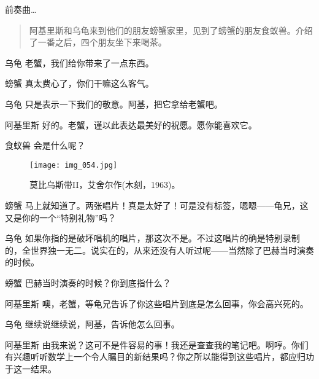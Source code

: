 
\begin{dialog}{前奏曲…}

\begin{quote}
阿基里斯和乌龟来到他们的朋友螃蟹家里，见到了螃蟹的朋友食蚁兽。介绍了一番之后，四个朋友坐下来喝茶。
\end{quote}

\begin{dialogue}

\item[乌龟]老蟹，我们给你带来了一点东西。

\item[螃蟹]真太费心了，你们干嘛这么客气。

\item[乌龟]只是表示一下我们的敬意。阿基，把它拿给老蟹吧。

\item[阿基里斯]好的。老蟹，谨以此表达最美好的祝愿。愿你能喜欢它。


\item[食蚁兽]会是什么呢？

\begin{figure}
\texttt{[image: img\_054.jpg]}
\caption[莫比乌斯带II，艾舍尔作。]
  {莫比乌斯带II，艾舍尔作(木刻，1963)。}
\end{figure}

\item[螃蟹]马上就知道了。两张唱片！真是太好了！可是没有标签，嗯嗯——龟兄，这又是你的一个“特别礼物”吗？

\item[乌龟]如果你指的是破坏唱机的唱片，那这次不是。不过这唱片的确是特别录制的，全世界独一无二。说实在的，从来还没有人听过呢——当然除了巴赫当时演奏的时候。

\item[螃蟹]巴赫当时演奏的时候？你到底指什么？

\item[阿基里斯]噢，老蟹，等龟兄告诉了你这些唱片到底是怎么回事，你会高兴死的。

\item[乌龟]继续说继续说，阿基，告诉他怎么回事。

\item[阿基里斯]由我来说？这可不是件容易的事！我还是查查我的笔记吧。啊哼。你们有兴趣听听数学上一个令人瞩目的新结果吗？你之所以能得到这些唱片，都应归功于这一结果。


\end{dialogue}
\end{dialog}

